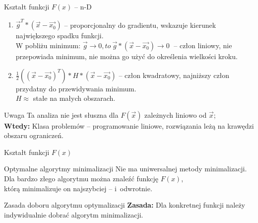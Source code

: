   \begin{frame}{Kształt funkcji $ F(x) $ -- n-D}
    \begin{enumerate}
      \item $ \vec{g}^T * (\vec{x} - \vec{x_0}) $ -- proporcjonalny do
      gradientu, wskazuje kierunek największego spadku funkcji.\\
      W pobliżu minimum: $ \vec{g} \to 0{, to}\ \vec{g}*(\vec{x} - \vec{x_0}) \to 0
      \;$ -- człon liniowy, nie przepowiada minimum,
      nie można go użyć do określenia wielkości kroku.

      \item $ \frac{1}{2}((\vec{x} - \vec{x_0})^T) * H * (\vec{x} - \vec{x_0}) $
      -- człon kwadratowy, najniższy człon przydatny do przewidywania minimum.\\
      $ H \approx $ stałe na małych obszarach.
    \end{enumerate}

    \begin{alertblock}{Uwaga}
      Ta analiza nie jest słuszna dla $ F(\vec{x}) $ zależnych liniowo
      od $ \vec{x} $;\\
      \textbf{Wtedy:} Klasa problemów -- programowanie liniowe, rozwiązania leżą na krawędzi obszaru ograniczeń.
    \end{alertblock}
  \end{frame}

  \begin{frame}{Kształt funkcji $ F(x) $}
    \begin{block}{Optymalne algorytmy minimalizacji}
      Nie ma uniwersalnej metody minimalizacji. \\
      Dla bardzo złego algorytmu można znaleźć funkcję $ F(x) $,\\
      którą minimalizuje on najszybciej -- i~odwrotnie.
    \end{block}
    \begin{block}{Zasada doboru algorytmu optymalizacji}
      \textbf{Zasada:} Dla konkretnej funkcji należy indywidualnie dobrać algorytm minimalizacji.
    \end{block}

  \end{frame}
